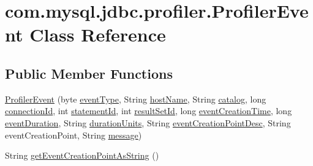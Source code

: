 \hypertarget{classcom_1_1mysql_1_1jdbc_1_1profiler_1_1_profiler_event}{}\section{com.\+mysql.\+jdbc.\+profiler.\+Profiler\+Event Class Reference}
\label{classcom_1_1mysql_1_1jdbc_1_1profiler_1_1_profiler_event}
\subsection*{Public Member Functions}
\begin{DoxyCompactItemize}
\item 
\mbox{\hyperlink{classcom_1_1mysql_1_1jdbc_1_1profiler_1_1_profiler_event_ad8b797e8effa08aa412f59758be2c2b4}{Profiler\+Event}} (byte \mbox{\hyperlink{classcom_1_1mysql_1_1jdbc_1_1profiler_1_1_profiler_event_ad6b8f61f050154e78ff191693d24f577}{event\+Type}}, String \mbox{\hyperlink{classcom_1_1mysql_1_1jdbc_1_1profiler_1_1_profiler_event_ab10bb00ac3fe47677ad5b2ce225a9e44}{host\+Name}}, String \mbox{\hyperlink{classcom_1_1mysql_1_1jdbc_1_1profiler_1_1_profiler_event_aa7004cee55f006e0666c602f1a5b07bc}{catalog}}, long \mbox{\hyperlink{classcom_1_1mysql_1_1jdbc_1_1profiler_1_1_profiler_event_a445919f2e674d2b75c42a8a2456ea0e7}{connection\+Id}}, int \mbox{\hyperlink{classcom_1_1mysql_1_1jdbc_1_1profiler_1_1_profiler_event_af5386e1f6681fdf030b5f693dec2440c}{statement\+Id}}, int \mbox{\hyperlink{classcom_1_1mysql_1_1jdbc_1_1profiler_1_1_profiler_event_a76097357910684be9b8701f2a111c60f}{result\+Set\+Id}}, long \mbox{\hyperlink{classcom_1_1mysql_1_1jdbc_1_1profiler_1_1_profiler_event_a4ab76316294a2846c1b2a83cd696d6cf}{event\+Creation\+Time}}, long \mbox{\hyperlink{classcom_1_1mysql_1_1jdbc_1_1profiler_1_1_profiler_event_a16e398a98262c89723022a8ab19974c4}{event\+Duration}}, String \mbox{\hyperlink{classcom_1_1mysql_1_1jdbc_1_1profiler_1_1_profiler_event_a4a5e45fb47ae2f11e5fddd7257feebda}{duration\+Units}}, String \mbox{\hyperlink{classcom_1_1mysql_1_1jdbc_1_1profiler_1_1_profiler_event_a8ff1cab51f5065edb91a8d9f364decca}{event\+Creation\+Point\+Desc}}, String event\+Creation\+Point, String \mbox{\hyperlink{classcom_1_1mysql_1_1jdbc_1_1profiler_1_1_profiler_event_aec15467b3a256046f8402f3a086ce70d}{message}})
\item 
String \mbox{\hyperlink{classcom_1_1mysql_1_1jdbc_1_1profiler_1_1_profiler_event_a6f3a1cc85995d238f59f17f6b4e24f10}{get\+Event\+Creation\+Point\+As\+String}} ()

\end{DoxyCompactItemize}
